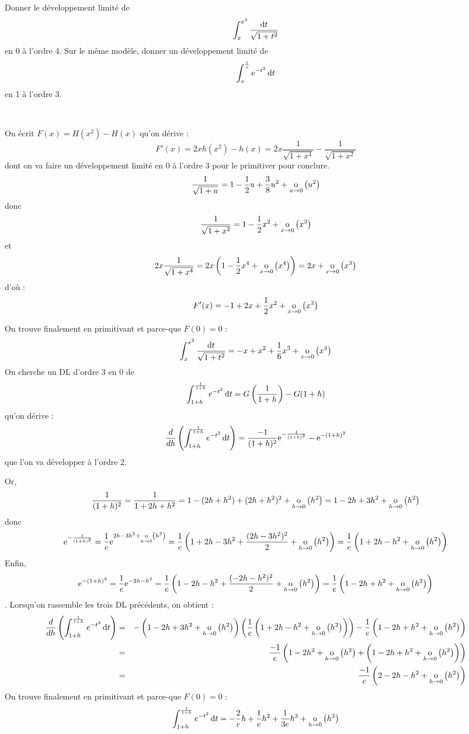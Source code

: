 \documentclass{magnolia}
\begin{document}
\begin{questions}
\question Donner le développement limité de
  \[\integinv{x}{x^2}{\sqrt{1+t^2}}{t}\]
  en 0 à l'ordre 4.
\question Sur le même modèle, donner un développement limité de
  \[\integ{x}{\frac{1}{x}}{\e^{-t^2}}{t}\]
  en 1 à l'ordre 3.
\end{questions}
\begin{sol}
$\quad$
\begin{questions}
\question On écrit $F(x)=H(x^2)-H(x)$ qu'on dérive :
$$F'(x)=2xh(x^2)-h(x)=2x\frac{1}{\sqrt{1+x^4}}-\frac{1}{\sqrt{1+x^2}}$$ dont on va faire un développement limité en $0$ à l'ordre $3$ pour le primitiver pour conclure.
$$\frac{1}{\sqrt{1+u}}=1-\frac{1}{2}u+\frac{3}{8}u^2+\petitozero{u}{u^2}$$ donc 
$$\frac{1}{\sqrt{1+x^2}}=1-\frac{1}{2}x^2+\petitozero{x}{x^3}$$
et $$2x\frac{1}{\sqrt{1+x^4}}=2x\p{1-\frac{1}{2}x^4+\petitozero{x}{x^4}}=2x+\petitozero{x}{x^3}$$
d'où :
$$F'(x)=-1+2x+\frac{1}{2}x^2+\petitozero{x}{x^3}$$

On trouve finalement en primitivant et parce-que $F(0)=0$ :
  \[\integinv{x}{x^2}{\sqrt{1+t^2}}{t}=-x+x^2+\frac{1}{6}x^3+\petitozero{x}{x^4}\]
\question On cherche un DL d'ordre $3$ en $0$ de 
$$\integ{1+h}{\frac{1}{1+h}}{e^{-t^2}}{t}=G\p{\frac{1}{1+h}}-G(1+h)$$ qu'on dérive :
$$\frac{d}{dh}\p{\integ{1+h}{\frac{1}{1+h}}{e^{-t^2}}{t}}=\frac{-1}{(1+h)^2}\e^{-\frac{1}{(1+h)^2}}-\e^{-(1+h)^2}$$ que l'on va développer à l'ordre $2$.

Or, $$\frac{1}{(1+h)^2}=\frac{1}{1+2h+h^2}=1-(2h+h^2)+(2h+h^2)^2+\petitozero{h}{h^2}=1-2h+3h^2+\petitozero{h}{h^2}$$
donc
$$\e^{-\frac{1}{(1+h)^2}}=\frac{1}{e}\e^{2h-3h^2+\petitozero{h}{h^2}}=\frac{1}{e}\p{1+2h-3h^2+\frac{(2h-3h^2)^2}{2}+\petitozero{h}{h^2}}=\frac{1}{e}\p{1+2h-h^2+\petitozero{h}{h^2}}$$
Enfin,
$$\e^{-(1+h)^2}=\frac{1}{e}\e^{-2h-h^2}=\frac{1}{e}\p{1-2h-h^2+\frac{(-2h-h^2)^2}{2}+\petitozero{h}{h^2}}=\frac{1}{e}\p{1-2h+h^2+\petitozero{h}{h^2}}$$.
Lorsqu'on rassemble les trois DL précédents, on obtient :
\begin{eqnarray*}
\frac{d}{dh}\p{\integ{1+h}{\frac{1}{1+h}}{e^{-t^2}}{t}}&=&-\p{1-2h+3h^2+\petitozero{h}{h^2}}\p{\frac{1}{e}\p{1+2h-h^2+\petitozero{h}{h^2}}}-\frac{1}{e}\p{1-2h+h^2+\petitozero{h}{h^2}}\\
&=&\frac{-1}{e}\p{1-2h^2+\petitozero{h}{h^2}+\p{1-2h+h^2+\petitozero{h}{h^2}}}\\
&=&\frac{-1}{e}\p{2-2h-h^2+\petitozero{h}{h^2}}
\end{eqnarray*}
On trouve finalement en primitivant et parce-que $F(0)=0$ :
  \[\integ{1+h}{\frac{1}{1+h}}{e^{-t^2}}{t}=-\frac{2}{e}h+\frac{1}{e}h^2+\frac{1}{3e}h^3+\petitozero{h}{h^3}\]
\end{questions}
\end{sol}
\end{document}
